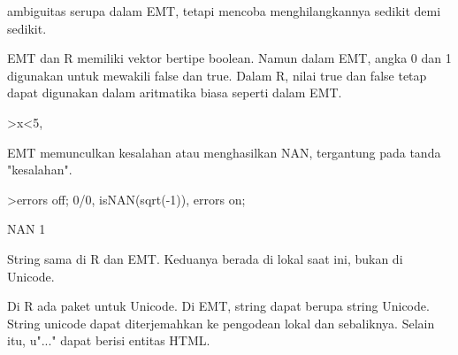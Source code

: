 \documentclass[a4paper,10pt]{article}
\begin{document}
\begin{eulernotebook}
\begin{eulercomment}
\begin{eulercomment}
\begin{eulercomment}
\begin{eulercomment}
\begin{eulercomment}
\begin{eulercomment}
\begin{eulercomment}
\begin{eulercomment}
\begin{eulercomment}
\begin{eulercomment}
\begin{eulercomment}
\begin{eulercomment}
\begin{eulercomment}
\begin{eulercomment}
\begin{eulercomment}
\begin{eulercomment}
\begin{eulercomment}
\begin{eulercomment}
\begin{eulercomment}
\begin{eulercomment}
\begin{eulercomment}
\begin{eulercomment}
\begin{eulercomment}
\begin{eulercomment}
\begin{eulercomment}
\begin{eulercomment}
\begin{eulercomment}
\begin{eulercomment}
\begin{eulercomment}
\begin{eulercomment}
\begin{eulercomment}
\begin{eulercomment}
\begin{eulercomment}
\begin{eulercomment}
\begin{eulercomment}
\begin{eulercomment}
\begin{eulercomment}
\begin{eulercomment}
\begin{eulercomment}
\begin{eulercomment}
\begin{eulercomment}
\begin{eulercomment}
\begin{eulercomment}
\begin{eulercomment}
\begin{eulercomment}
\begin{eulercomment}
\begin{eulercomment}
\begin{eulercomment}
\begin{eulercomment}
\begin{eulercomment}
\begin{eulercomment}
\begin{eulercomment}
\begin{eulercomment}
\begin{eulercomment}
\begin{eulercomment}
\begin{eulercomment}
\begin{eulercomment}
\begin{eulercomment}
\begin{eulercomment}
\begin{eulercomment}
\begin{eulercomment}
\begin{eulercomment}
\begin{eulercomment}
\begin{eulercomment}
\begin{eulercomment}
\begin{eulercomment}
\begin{eulercomment}
\begin{eulercomment}
\begin{eulercomment}
ambiguitas serupa dalam EMT, tetapi mencoba menghilangkannya
sedikit demi sedikit.

EMT dan R memiliki vektor bertipe boolean. Namun dalam EMT, angka 0
dan 1 digunakan untuk mewakili false dan true. Dalam R, nilai true dan
false tetap dapat digunakan dalam aritmatika biasa seperti dalam EMT.
\end{eulercomment}
\begin{eulerprompt}
>x<5, %
\end{eulerprompt}
\begin{euleroutput}
  [0,  0,  1,  0,  0]
  [0,  0,  3.1,  0,  0]
\end{euleroutput}
\begin{eulercomment}
EMT memunculkan kesalahan atau menghasilkan NAN, tergantung pada tanda
"kesalahan".
\end{eulercomment}
\begin{eulerprompt}
>errors off; 0/0, isNAN(sqrt(-1)), errors on;
\end{eulerprompt}
\begin{euleroutput}
  NAN
  1
\end{euleroutput}
\begin{eulercomment}
String sama di R dan EMT. Keduanya berada di lokal saat ini, bukan di
Unicode.

Di R ada paket untuk Unicode. Di EMT, string dapat berupa string
Unicode. String unicode dapat diterjemahkan ke pengodean lokal dan
sebaliknya. Selain itu, u"..." dapat berisi entitas HTML.
\end{eulercomment}
\end{eulercomment}
\end{eulercomment}
\end{eulercomment}
\end{eulercomment}
\end{eulercomment}
\end{eulercomment}
\end{eulercomment}
\end{eulercomment}
\end{eulercomment}
\end{eulercomment}
\end{eulercomment}
\end{eulercomment}
\end{eulercomment}
\end{eulercomment}
\end{eulercomment}
\end{eulercomment}
\end{eulercomment}
\end{eulercomment}
\end{eulercomment}
\end{eulercomment}
\end{eulercomment}
\end{eulercomment}
\end{eulercomment}
\end{eulercomment}
\end{eulercomment}
\end{eulercomment}
\end{eulercomment}
\end{eulercomment}
\end{eulercomment}
\end{eulercomment}
\end{eulercomment}
\end{eulercomment}
\end{eulercomment}
\end{eulercomment}
\end{eulercomment}
\end{eulercomment}
\end{eulercomment}
\end{eulercomment}
\end{eulercomment}
\end{eulercomment}
\end{eulercomment}
\end{eulercomment}
\end{eulercomment}
\end{eulercomment}
\end{eulercomment}
\end{eulercomment}
\end{eulercomment}
\end{eulercomment}
\end{eulercomment}
\end{eulercomment}
\end{eulercomment}
\end{eulercomment}
\end{eulercomment}
\end{eulercomment}
\end{eulercomment}
\end{eulercomment}
\end{eulercomment}
\end{eulercomment}
\end{eulercomment}
\end{eulercomment}
\end{eulercomment}
\end{eulercomment}
\end{eulercomment}
\end{eulercomment}
\end{eulercomment}
\end{eulercomment}
\end{eulercomment}
\end{eulercomment}
\end{eulernotebook}
\end{document}
